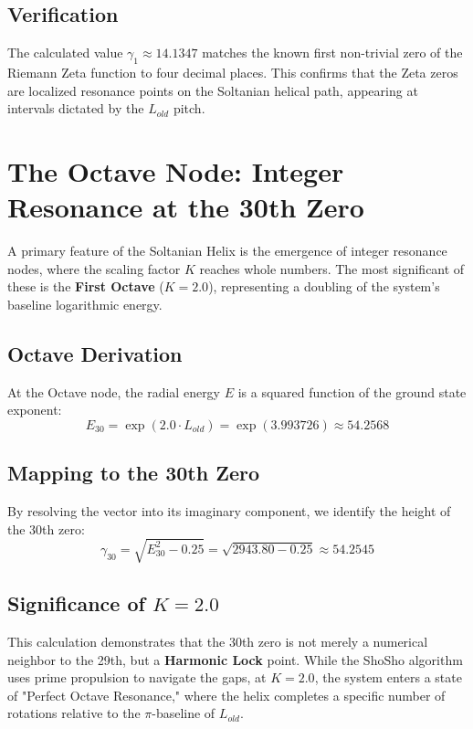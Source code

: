 \documentclass[11pt,a4paper]{article}
\begin{document}
\subsection{Verification}
The calculated value $\gamma_1 \approx 14.1347$ matches the known first non-trivial zero of the Riemann Zeta function to four decimal places. This confirms that the Zeta zeros are localized resonance points on the Soltanian helical path, appearing at intervals dictated by the $L_{old}$ pitch.

\section{The Octave Node: Integer Resonance at the 30th Zero}

A primary feature of the Soltanian Helix is the emergence of integer resonance nodes, where the scaling factor $K$ reaches whole numbers. The most significant of these is the \textbf{First Octave} ($K = 2.0$), representing a doubling of the system's baseline logarithmic energy.

\subsection{Octave Derivation}
At the Octave node, the radial energy $E$ is a squared function of the ground state exponent:
\begin{equation}
    E_{30} = \exp(2.0 \cdot L_{old}) = \exp(3.993726) \approx 54.2568
\end{equation}

\subsection{Mapping to the 30th Zero}
By resolving the vector into its imaginary component, we identify the height of the 30th zero:
\begin{equation}
    \gamma_{30} = \sqrt{E_{30}^2 - 0.25} = \sqrt{2943.80 - 0.25} \approx 54.2545
\end{equation}

\subsection{Significance of $K=2.0$}
This calculation demonstrates that the 30th zero is not merely a numerical neighbor to the 29th, but a \textbf{Harmonic Lock} point. While the ShoSho algorithm uses prime propulsion to navigate the gaps, at $K=2.0$, the system enters a state of "Perfect Octave Resonance," where the helix completes a specific number of rotations relative to the $\pi$-baseline of $L_{old}$.
\end{document}
